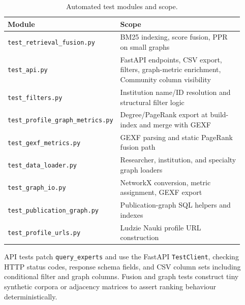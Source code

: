 \documentclass{article}
\begin{document}
\begin{table}[htbp]
  \centering
  \caption{Automated test modules and scope.}
  \label{tab:test-modules}
  \small
  \begin{tabular}{@{}p{0.38\linewidth}p{0.54\linewidth}@{}}
    \toprule
    Module & Scope \\
    \midrule
    \texttt{test\_retrieval\_fusion.py} & BM25 indexing, score fusion, PPR on small graphs \\
    \texttt{test\_api.py} & FastAPI endpoints, CSV export, filters, graph-metric enrichment, Community column visibility \\
    \texttt{test\_filters.py} & Institution name/ID resolution and structural filter logic \\
    \texttt{test\_profile\_graph\_metrics.py} & Degree/PageRank export at build-index and merge with GEXF \\
    \texttt{test\_gexf\_metrics.py} & GEXF parsing and static PageRank fusion path \\
    \texttt{test\_data\_loader.py} & Researcher, institution, and specialty graph loaders \\
    \texttt{test\_graph\_io.py} & NetworkX conversion, metric assignment, GEXF export \\
    \texttt{test\_publication\_graph.py} & Publication-graph SQL helpers and indexes \\
    \texttt{test\_profile\_urls.py} & Ludzie Nauki profile URL construction \\
    \bottomrule
  \end{tabular}
\end{table}

API tests patch \texttt{query\_experts} and use the FastAPI \texttt{TestClient}, checking HTTP status codes, response schema fields, and CSV column sets including conditional filter and graph columns. Fusion and graph tests construct tiny synthetic corpora or adjacency matrices to assert ranking behaviour deterministically.


\printbibliography
\end{document}
